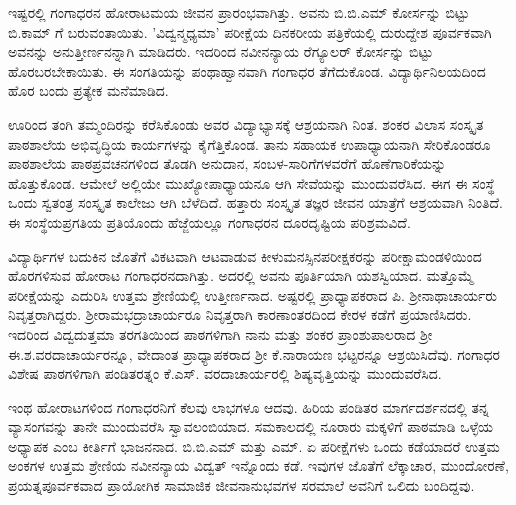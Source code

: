 {ಇಷ್ಟರಲ್ಲಿ ಗಂಗಾಧರನ ಹೋರಾಟಮಯ ಜೀವನ ಪ್ರಾರಂಭವಾಗಿತ್ತು. ಅವನು  ಬಿ.ಬಿ.ಎಮ್ ಕೋರ್ಸನ್ನು ಬಿಟ್ಟು  ಬಿ.ಕಾಮ್ ಗೆ ಬರುವಂತಾಯಿತು. 'ವಿದ್ವನ್ಮಧ್ಯಮಾ' ಪರೀಕ್ಷೆಯ  ದಿನಕರೀಯ ಪತ್ರಿಕೆಯಲ್ಲಿ ದುರುದ್ದೇಶ ಪೂರ್ವಕವಾಗಿ ಅವನನ್ನು ಅನು\-ತ್ತೀರ್ಣನನ್ನಾಗಿ ಮಾಡಿದರು. ಇದರಿಂದ ನವೀನನ್ಯಾಯ ರೆಗ್ಯೂಲರ್ ಕೋರ್ಸನ್ನು ಬಿಟ್ಟು ಹೊರಬರಬೇಕಾಯಿತು. ಈ ಸಂಗತಿಯನ್ನು ಪಂಥಾಹ್ವಾನವಾಗಿ ಗಂಗಾಧರ ತೆಗೆದುಕೊಂಡ. ವಿದ್ಯಾರ್ಥಿನಿಲಯದಿಂದ ಹೊರ ಬಂದು ಪ್ರತ್ಯೇಕ ಮನೆಮಾಡಿದ.

ಊರಿಂದ ತಂಗಿ ತಮ್ಮಂದಿರನ್ನು ಕರೆಸಿಕೊಂಡು ಅವರ ವಿದ್ಯಾಭ್ಯಾಸಕ್ಕೆ ಆಶ್ರಯನಾಗಿ ನಿಂತ. ಶಂಕರ ವಿಲಾಸ ಸಂಸ್ಕೃತ ಪಾಠಶಾಲೆಯ ಅಭಿವೃದ್ಧಿಯ ಕಾರ್ಯಗಳನ್ನು ಕೈಗೆತ್ತಿಕೊಂಡ. ತಾನು ಸಹಾಯಕ ಉಪಾಧ್ಯಾಯನಾಗಿ  ಸೇರಿಕೊಂಡರೂ ಪಾಠಶಾಲೆಯ ಪಾಠ\-ಪ್ರವಚನಗಳಿಂದ  ತೊಡಗಿ ಅನುದಾನ, ಸಂಬಳ-ಸಾರಿಗೆಗಳವರೆಗೆ ಹೊಣೆಗಾರಿಕೆಯನ್ನು ಹೊತ್ತುಕೊಂಡ. ಆಮೇಲೆ ಅಲ್ಲಿಯೇ ಮುಖ್ಯೋಪಾಧ್ಯಾಯನೂ ಆಗಿ ಸೇವೆಯನ್ನು  ಮುಂದುವರೆಸಿದ. ಈಗ ಈ ಸಂಸ್ಥೆ ಒಂದು ಸ್ವತಂತ್ರ ಸಂಸ್ಕೃತ ಕಾಲೇಜು ಆಗಿ ಬೆಳೆದಿದೆ. ಹತ್ತಾರು ಸಂಸ್ಕೃತ ತಜ್ಞರ ಜೀವನ ಯಾತ್ರೆಗೆ ಆಶ್ರಯವಾಗಿ ನಿಂತಿದೆ. ಈ ಸಂಸ್ಥೆಯ\break ಪ್ರಗತಿಯ ಪ್ರತಿಯೊಂದು ಹೆಜ್ಜೆಯಲ್ಲೂ ಗಂಗಾಧರನ ದೂರದೃಷ್ಟಿಯ ಪರಿಶ್ರಮವಿದೆ. 

ವಿದ್ಯಾರ್ಥಿಗಳ ಬದುಕಿನ ಜೊತೆಗೆ ವಿಕಟವಾಗಿ ಆಟವಾಡುವ ಕೀಳುಮನಸ್ಸಿನ\break ಪರೀಕ್ಷಕರನ್ನು  ಪರೀಕ್ಷಾಮಂಡಳಿಯಿಂದ ಹೊರಗಳಿಸುವ ಹೋರಾಟ ಗಂಗಾಧರನ\-ದಾಗಿತ್ತು.  ಅದರಲ್ಲಿ ಅವನು ಪೂರ್ತಿಯಾಗಿ ಯಶಸ್ವಿಯಾದ. ಮತ್ತೊಮ್ಮೆ ಪರೀಕ್ಷೆಯನ್ನು  ಎದುರಿಸಿ ಉತ್ತಮ ಶ್ರೇಣಿಯಲ್ಲಿ ಉತ್ತೀರ್ಣನಾದ. ಅಷ್ಟರಲ್ಲಿ ಪ್ರಾಧ್ಯಾಪಕ\-ರಾದ ಪಿ. ಶ್ರೀನಾಥಾಚಾರ್ಯರು ನಿವೃತ್ತರಾಗಿದ್ದರು. \-ಶ್ರೀರಾಮಭದ್ರಾಚಾರ್ಯರೂ ನಿವೃತ್ತ\-ರಾಗಿ  ಕಾರಣಾಂತರದಿಂದ ಕೇರಳ ಕಡೆಗೆ ಪ್ರಯಾಣಿಸಿದರು. ಇದರಿಂದ \-ವಿದ್ವದುತ್ತಮಾ ತರಗತಿಯಿಂದ ಪಾಠಗಳಿಗಾಗಿ ನಾನು ಮತ್ತು ಶಂಕರ ಪ್ರಾಂಶುಪಾಲರಾದ ಶ್ರೀ ಈ.ಶ.ವರದಾಚಾರ್ಯರನ್ನೂ, ವೇದಾಂತ ಪ್ರಾಧ್ಯಾಪಕರಾದ ಶ್ರೀ ಕೆ.ನಾರಾಯಣ ಭಟ್ಟರನ್ನೂ ಆಶ್ರಯಿಸಿದೆವು. ಗಂಗಾಧರ ವಿಶೇಷ ಪಾಠಗಳಿಗಾಗಿ ಪಂಡಿತರತ್ನಂ ಕೆ.ಎಸ್. ವರದಾ\-ಚಾರ್ಯರಲ್ಲಿ ಶಿಷ್ಯವೃತ್ತಿಯನ್ನು ಮುಂದುವರೆಸಿದ. 

ಇಂಥ ಹೋರಾಟಗಳಿಂದ ಗಂಗಾಧರನಿಗೆ ಕೆಲವು ಲಾಭಗಳೂ ಆದವು. ಹಿರಿಯ ಪಂಡಿತರ ಮಾರ್ಗದರ್ಶನದಲ್ಲಿ ತನ್ನ ವ್ಯಾಸಂಗವನ್ನು ತಾನೇ ಮುಂದುವರೆಸಿ ಸ್ವಾವಲಂಬಿ\-ಯಾದ. ಸಮಕಾಲದಲ್ಲಿ ನೂರಾರು ಮಕ್ಕಳಿಗೆ ಪಾಠಮಾಡಿ ಒಳ್ಳೆಯ ಅಧ್ಯಾಪಕ ಎಂಬ ಕೀರ್ತಿಗೆ ಭಾಜನನಾದ. ಬಿ.ಬಿ.ಎಮ್ ಮತ್ತು ಎಮ್. ಏ ಪರೀಕ್ಷೆಗಳು ಒಂದು ಕಡೆಯಾದರೆ ಉತ್ತಮ ಅಂಕಗಳ ಉತ್ತಮ ಶ್ರೇಣಿಯ ನವೀನನ್ಯಾಯ ವಿದ್ವತ್ ಇನ್ನೊಂದು ಕಡೆ. ಇವುಗಳ ಜೊತೆಗೆ ಲೆಕ್ಕಾಚಾರ, ಮುಂದೋರಣೆ, ಪ್ರಯತ್ನಪೂರ್ವಕವಾದ ಪ್ರಾಯೋಗಿಕ ಸಾಮಾಜಿಕ   ಜೀವನಾನುಭವಗಳ ಸರಮಾಲೆ ಅವನಿಗೆ ಒಲಿದು ಬಂದಿದ್ದವು. 

}
